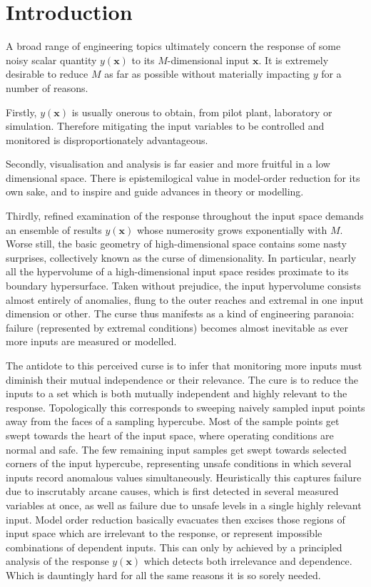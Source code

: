 \documentclass[preprint,12pt]{elsarticle}
\newcommand*{\M}[1]{\ensuremath{#1}\xspace}
\newcommand*{\vr}[1]{\M{\mathbf{#1}}}
\begin{document}

    \section{Introduction} \label{sec:Intro}
        A broad range of engineering topics ultimately concern the response of some noisy scalar quantity $y(\vr{x})$ to its \M{M}-dimensional input $\vr{x}$. It is extremely desirable to reduce \M{M} as far as possible without materially impacting \M{y} for a number of reasons. 
        
        Firstly, $y(\vr{x})$ is usually onerous to obtain, from pilot plant, laboratory or simulation. Therefore mitigating the input variables to be controlled and monitored is disproportionately advantageous.
        
        Secondly, visualisation and analysis is far easier and more fruitful in a low dimensional space.
        There is epistemilogical value in model-order reduction for its own sake, and to inspire and guide advances in theory or modelling.
        
        Thirdly, refined examination of the response throughout the input space demands an ensemble of results $y(\vr{x})$ whose numerosity grows exponentially with \M{M}. Worse still, the basic geometry of high-dimensional space contains some nasty surprises, collectively known as the curse of dimensionality. In particular, nearly all the hypervolume of a high-dimensional input space resides proximate to its boundary hypersurface. Taken without prejudice, the input hypervolume consists almost entirely of anomalies, flung to the outer reaches and extremal in one input dimension or other. The curse thus manifests as a kind of engineering paranoia: failure (represented by extremal conditions) becomes almost inevitable as ever more inputs are measured or modelled.

        The antidote to this perceived curse is to infer that monitoring more inputs must diminish their mutual independence or their relevance. The cure is to reduce the inputs to a set which is both mutually independent and highly relevant to the response. Topologically this corresponds to sweeping naively sampled input points away from the faces of a sampling hypercube. Most of the sample points get swept towards the heart of the input space, where operating conditions are normal and safe. The few remaining input samples get swept towards selected corners of the input hypercube, representing unsafe conditions in which several inputs record anomalous values simultaneously. Heuristically this captures failure due to inscrutably arcane causes, which is first detected in several measured variables at once, as well as failure due to unsafe levels in a single highly relevant input. Model order reduction basically evacuates then excises those regions of input space which are irrelevant to the response, or represent impossible combinations of dependent inputs. This can only by achieved by a principled analysis of the response $y(\vr{x})$ which detects both irrelevance and dependence. Which is dauntingly hard for all the same reasons it is so sorely needed.
\end{document}
